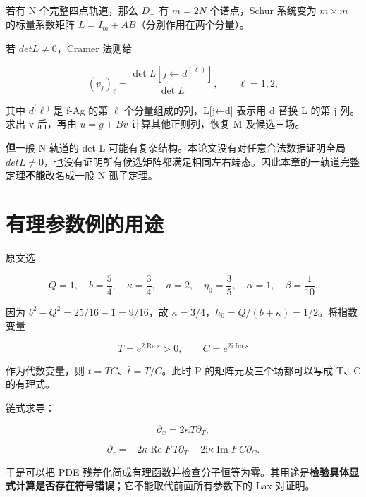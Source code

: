 若有 N 个完整四点轨道，那么 $D_{+}$ 有 $m=2N$ 个谱点，Schur 系统变为 $m\times{}m$ 的标量系数矩阵 $L=I_m+AB$（分别作用在两个分量）。\par

若 $det L\ne{}0$，Cramer 法则给\par

\[
(v_j)_\ell=
\dfrac{\det L[j\leftarrow d^{(\ell)}]}{\det L},
\qquad \ell=1,2,
\]

其中 $d^{(}\ell{}^{)}$ 是 f-Ag 的第 $\ell{}$ 个分量组成的列，L[j←d] 表示用 d 替换 L 的第 j 列。求出 v 后，再由 $u=g+Bv$ 计算其他正则列，恢复 M 及候选三场。\par

\textbf{但}一般 N 轨道的 det L 可能有复杂结构。本论文没有对任意合法数据证明全局 $detL\ne{}0$，也没有证明所有候选矩阵都满足相同左右端态。因此本章的一轨道完整定理\textbf{不能}改名成一般 N 孤子定理。\par

\section{有理参数例的用途}
\par

原文选\par

\[
Q=1,\quad b=\dfrac{5}{4},\quad
\kappa=\dfrac{3}{4},\quad
a=2,\quad\eta_0=\dfrac{3}{5},\quad
\alpha=1,\quad\beta=\dfrac{1}{10}.
\]

因为 $b^{2}-Q^{2}=25/16-1=9/16$，故 $\kappa{}=3/4$，$h_{0}=Q/(b+\kappa{})=1/2$。将指数变量\par

\[
T=e^{2\operatorname{Re}s}>0,\qquad
C=e^{2\mathrm{i}\operatorname{Im}s}
\]

作为代数变量，则 $t=TC$、$\bar t=T/C$。此时 P 的矩阵元及三个场都可以写成 T、C 的有理式。\par

链式求导：\par

\[
\partial_x=2\kappa T\partial_T,
\]

\[
\partial_z
=-2\kappa\operatorname{Re}F\,T\partial_T
-2\mathrm{i}\kappa\operatorname{Im}F\,C\partial_C.
\]

于是可以把 PDE 残差化简成有理函数并检查分子恒等为零。其用途是\textbf{检验具体显式计算是否存在符号错误}；它不能取代前面所有参数下的 Lax 对证明。\par

